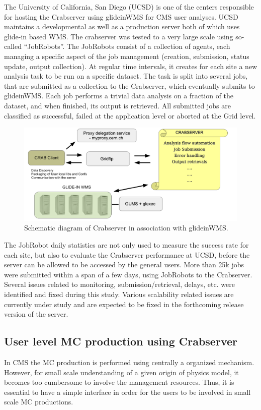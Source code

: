 \documentclass[a4paper]{jpconf}
\begin{document}
The University of California, San Diego (UCSD) is one of the centers responsible for hosting 
the Crabserver using glideinWMS for CMS user analyses. UCSD maintains a developmental as well 
as a production server both of which uses glide-in based WMS. The crabserver was tested to a very large 
scale using so-called ``JobRobots''. The JobRobots consist of a collection of agents, each 
managing a specific aspect of the job management (creation, submission, status
update, output collection). At regular time intervals, it creates for
each site a new analysis task to be run on a specific dataset. The
task is split into several jobs, that are submitted as a collection to
the Crabserver, which eventually submits to glideinWMS. Each job
performs a trivial data analysis on a fraction of the dataset, and when
finished, its output is retrieved. All submitted jobs are classified
as successful, failed at the application level or aborted at the Grid
level.
\begin{figure}
\begin{center}
\includegraphics[scale=0.4]{crabserver}
\end{center}
\caption{Schematic diagram of Crabserver in association with glideinWMS.}
\label{fig:crabserver}
\end{figure}
The JobRobot daily statistics are not only used to measure the success rate for each site, 
but also to evaluate the Crabserver performance at UCSD, before the server can be allowed 
to be accessed by the general users. More than 25k jobs were submitted within a span of a 
few days, using JobRobots to the Crabserver. Several issues related to monitoring, 
submission/retrieval, delays, etc. were identified and fixed during this study. Various scalability
related issues are currently under study and are expected to be fixed in the forthcoming
release version of the server.
\subsection{User level MC production using Crabserver}
In CMS the MC production is performed using centrally a organized mechanism. However,
for small scale understanding of a given origin of physics model, it becomes too cumbersome
to involve the management resources. Thus, it is essential to have a simple interface
in order for the users to be involved in small scale MC productions. 
\end{document}
